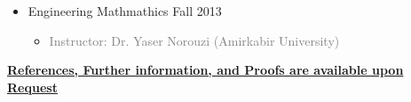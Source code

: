 \begin{itemize}
\begin{itemize}
		\item {} Engineering Mathmathics \hfill Fall 2013
		\begin{itemize} 
			\item\textcolor{gray}{Instructor: Dr. Yaser Norouzi (Amirkabir University)} 
			\newline
		\end{itemize}
	
	\end{itemize}
\end{itemize}


\centerline{\underline{\textbf{	\faExclamationCircle \hspace{0.5 pt} References, Further information, and Proofs are available upon Request}}}
